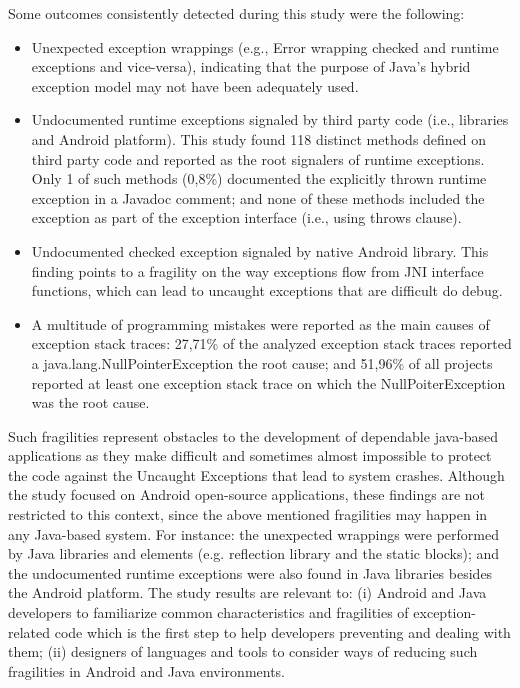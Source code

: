 \documentclass[conference]{IEEEtran}
\begin{document}
Some outcomes consistently detected during this study were the following:

\begin{itemize}


   \item  Unexpected exception wrappings (e.g., Error wrapping checked and runtime
    exceptions and vice-versa), indicating that the purpose of Java's hybrid exception model may not have been adequately used.

   \item Undocumented runtime exceptions signaled by third party  code (i.e., libraries and Android platform). 
This study found 118 distinct methods defined on third party code and  reported as the root signalers of 
runtime exceptions. Only 1 of such methods (0,8\%) documented the explicitly thrown runtime exception 
in a Javadoc comment; and none of these methods included the exception as part of the exception 
interface (i.e., using throws clause).

   \item Undocumented checked exception signaled by native Android library. This finding points to a fragility 
on the way exceptions flow from JNI interface functions, which can lead to uncaught exceptions that are difficult do 
debug.  

  \item  A multitude of programming mistakes were reported as the main causes of exception stack traces:
 27,71\% of the analyzed exception stack traces reported a java.lang.NullPointerException the root cause;
and  51,96\% of all projects reported at least one exception stack trace on which the NullPoiterException
was the root cause.

\end{itemize}

Such fragilities represent obstacles to the development of dependable java-based applications as they make difficult and 
sometimes almost impossible to protect the code against the Uncaught Exceptions that lead to system crashes.
Although the study focused on Android open-source applications, these findings are not restricted to this context, since 
the above mentioned fragilities may happen in any Java-based system. 
For instance: the unexpected wrappings were performed by Java libraries and elements (e.g. reflection library and 
the static blocks); and the undocumented runtime exceptions were also found in Java libraries besides the Android platform.
The study results are relevant to: (i) Android and Java developers to familiarize common characteristics and fragilities of exception-related code 
which is the first step to help developers preventing and dealing with them; (ii) designers of languages and tools to consider ways of reducing 
such fragilities in Android and Java environments.
\end{document}

